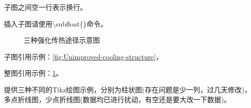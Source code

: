 子图之间空一行表示换行。

插入子图请使用\textbackslash subfloat\{\}命令。

\begin{figure}[htb]

    \caption{三种强化传热途径示意图}
    \label{fig:Three-enhanced-heat-transfer-paths}
\end{figure}

子图引用示例：\cref{fig:Unimproved-cooling-structure}，

整图引用示例：\cref{fig:Three-enhanced-heat-transfer-paths}。

提供三种不同的Tikz绘图示例，分别为柱状图(存在问题是少一列，过几天修改)，多点折线图，少点折线图(数据均已进行扰动，有空还是要大改一下数据)。

